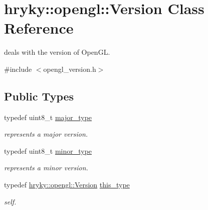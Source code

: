 \hypertarget{classhryky_1_1opengl_1_1_version}{\section{hryky\-:\-:opengl\-:\-:Version Class Reference}
\label{classhryky_1_1opengl_1_1_version}
}


deals with the version of Open\-G\-L.  




{\ttfamily \#include $<$opengl\-\_\-version.\-h$>$}

\subsection*{Public Types}
\begin{DoxyCompactItemize}
\item 
\hypertarget{classhryky_1_1opengl_1_1_version_ae789e987d102cbfb66372e180bd14c41}{typedef uint8\-\_\-t \hyperlink{classhryky_1_1opengl_1_1_version_ae789e987d102cbfb66372e180bd14c41}{major\-\_\-type}}\label{classhryky_1_1opengl_1_1_version_ae789e987d102cbfb66372e180bd14c41}

\begin{DoxyCompactList}\small\item\em represents a major version. \end{DoxyCompactList}\item 
\hypertarget{classhryky_1_1opengl_1_1_version_a88027fbb69404c3549a4582a41b2962d}{typedef uint8\-\_\-t \hyperlink{classhryky_1_1opengl_1_1_version_a88027fbb69404c3549a4582a41b2962d}{minor\-\_\-type}}\label{classhryky_1_1opengl_1_1_version_a88027fbb69404c3549a4582a41b2962d}

\begin{DoxyCompactList}\small\item\em represents a minor version. \end{DoxyCompactList}\item 
\hypertarget{classhryky_1_1opengl_1_1_version_a0ce0b6237bec7d7bd202655afbb7bc6a}{typedef \hyperlink{classhryky_1_1opengl_1_1_version}{hryky\-::opengl\-::\-Version} \hyperlink{classhryky_1_1opengl_1_1_version_a0ce0b6237bec7d7bd202655afbb7bc6a}{this\-\_\-type}}\label{classhryky_1_1opengl_1_1_version_a0ce0b6237bec7d7bd202655afbb7bc6a}

\begin{DoxyCompactList}\small\item\em self. \end{DoxyCompactList}\end{DoxyCompactItemize}

